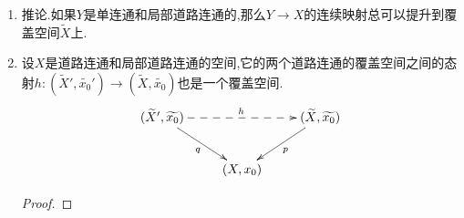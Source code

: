 \begin{enumerate}
\begin{proof}
		必要性是直接的,从$f=p\circ\widetilde{f}$得到$f_*\pi_1(Y,y_0)=p_*\widetilde{f}_*\pi_1(Y,y_0)\subsetneqq p_*\pi_1(\widetilde{X},\widetilde{x_0})$.
		
		\qquad
		
		充分性,我们来构造提升映射$\widetilde{f}$.任取$y\in Y$,按照道路连通性可取从$y_0$到$y$的道路$u$,于是$f\circ u$就是$X$中的以$x_0$为源端的道路,它可以提升为$\widetilde{X}$中的以$\widetilde{x_0}$为源端的道路$\widetilde{f\circ u}$,定义$\widetilde{f}(y)$是这个道路的终端.下面验证定义是良性的,如果取第二条从$y_0$到$y$的道路$u'$,那么$h_0=(fu')^{-1}\ast(fu)$是以$x_0$为基点的loop,于是$[h_0]\in f_*\pi_1(Y,y_0)\subset p_*\pi_1(\widetilde{X},\widetilde{x_0})$.于是存在以$\widetilde{x_0}$为基点的loop记作$\widetilde{h_1}$,使得$h_0$和$h_1=p\circ\widetilde{h_1}$是同伦的.按照同伦提升条件,这个同伦可以提升为$\widetilde{h_1}$到$\widetilde{h_0}$的同伦,其中$\widetilde{h_0}$是$h_0$的提升.导致$\widetilde{h_0}$也是以$\widetilde{x_0}$为基点的loop.按照道路提升的唯一性,$\widetilde{h_0}$的前半部分就是$fu$的提升,后半部分就是$(fu')^{-1}$的提升,于是必然有$\widetilde{fu}(1)=\widetilde{fu'}(1)$.这说明了定义不依赖于道路$u$的选取.
		
		\qquad
		
		最后验证$\widetilde{f}$是连续的.任取点$y\in Y$,固定一条从$y_0$到$y$的道路$u_1$.按照$Y$是局部道路连通的,它的局部道路连通开集构成拓扑基,所以可取$y$的局部道路连通开邻域$V$,使得$f(V)$落在某个容许开集$U\subset X$中.有$\widetilde{f}(y)\in p^{-1}(f(x))$,可取包含$\widetilde{f}(y)$的经$p$同胚到$U$的薄片为$\widetilde{U}$.在$V$上我们断言恒有$\widetilde{f}(y')=p^{-1}f(y')$,这里$p^{-1}$是从$U$到$\widetilde{U}$的同胚.断言成立是因为任取$y'\in V$,就可取包含在$V$内的从$y$到$y'$的道路$u_2$,那么$fu_2\ast fu_1$就可以提升为道路$\widetilde{fu_2}\ast\widetilde{fu_1}$,并且$\widetilde{f}(y')$按照定义是这个道路的终端,所以和$\widetilde{fu_1}$的部分没什么关系,而$\widetilde{fu_2}$整个落在$\widetilde{U}$中,于是有$\widetilde{f}(y')=\widetilde{fu_2}(1)=p^{-1}fu_2(1)=p^{-1}f(y')$.于是在$V$上就有$\widetilde{f}=p^{-1}f$,这得到连续性.
	\end{proof}
	\item 推论.如果$Y$是单连通和局部道路连通的,那么$Y\to X$的连续映射总可以提升到覆盖空间$\widetilde{X}$上.
	\item 设$X$是道路连通和局部道路连通的空间,它的两个道路连通的覆盖空间之间的态射$h:(\widetilde{X}',\widetilde{x_0}')\to(\widetilde{X},\widetilde{x_0})$也是一个覆盖空间.
	$$\xymatrix{(\widetilde{X}',\widetilde{x_0})\ar@{-->}[rr]^h\ar[dr]_q&&(\widetilde{X},\widetilde{x_0})\ar[dl]^p\\&(X,x_0)&}$$
	\begin{proof}
		

\end{proof}
\end{enumerate}
